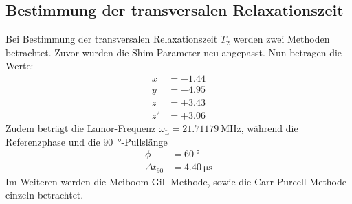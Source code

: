 \subsection{Bestimmung der transversalen Relaxationszeit}
Bei Bestimmung der transversalen Relaxationszeit $T_2$ werden zwei Methoden
betrachtet. Zuvor wurden die Shim-Parameter neu angepasst. Nun betragen die Werte:
\begin{align*}
  x &= -\num{1.44} \\
  y &= -\num{4.95} \\
  z &= +\num{3.43} \\
  z^2 &= +\num{3.06}
\end{align*}
Zudem beträgt die Lamor-Frequenz $\omega_\text{L} = \SI{21.71179}{\mega\hertz}$, während die
Referenzphase und die \SI{90}{\degree}-Pullslänge
\begin{align*}
  \phi &= \SI{60}{\degree} \\
  \Delta t_{90} &= \SI{4.40}{\micro\second}
\end{align*}
Im Weiteren werden die Meiboom-Gill-Methode, sowie die Carr-Purcell-Methode
einzeln betrachtet.
\newpage

